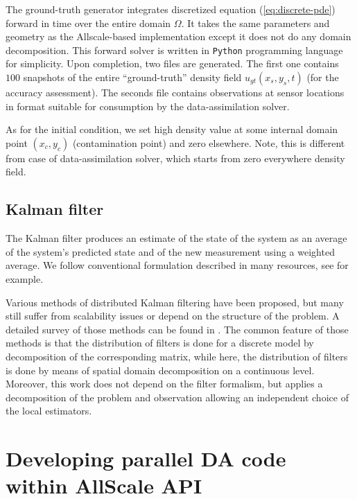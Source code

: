 \documentclass[acmsmall,review,anonymous]{acmart}\settopmatter{printfolios=true,printccs=false,printacmref=false}
\begin{document}
The ground-truth generator integrates discretized equation (\ref{eq:discrete-pde}) forward in time over the entire domain $\Omega$. It takes the same parameters and geometry as the Allscale-based implementation except it does not do any domain decomposition. This forward solver is written in \texttt{Python} programming language for simplicity. Upon completion, two files are generated. The first one contains $100$ snapshots of the entire ``ground-truth'' density field $u_{gt}(x_s,y_s,t)$ (for the accuracy assessment). The seconds file contains observations at sensor locations in format suitable for consumption by the data-assimilation solver. 

As for the initial condition, we set high density value at some internal domain point $(x_c,y_c)$ (contamination point) and zero elsewhere. Note, this is different from case of data-assimilation solver, which starts from zero everywhere density field.

\subsection{Kalman filter}

The Kalman filter produces an estimate of the state of the system as an average of the system's predicted state and of the new measurement using a weighted average. We follow conventional formulation described in many resources, see \cite{Welch06} for example.

Various methods of distributed Kalman filtering have been proposed, but many still suffer from scalability issues or depend on the structure of the problem. A detailed survey of those methods can be found in \citep{mahmoud2013distributed}. The common feature of those methods is that the distribution of filters is done for a discrete model by decomposition of the corresponding matrix, while here, the distribution of filters is done by means of spatial domain decomposition on
a continuous level. Moreover, this work does not depend on the filter formalism,
but applies a decomposition of the problem and observation allowing an independent choice of the local estimators.

\section{Developing parallel DA code within AllScale API}
\end{document}
